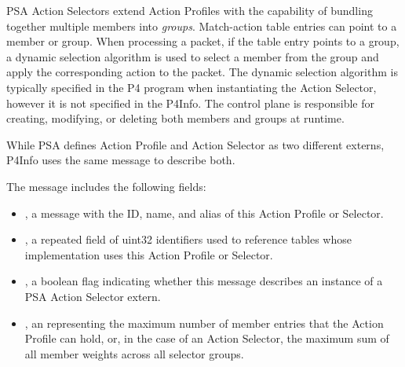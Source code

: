 \documentclass[11pt]{article}
\begin{document}
{%
PSA Action Selectors extend Action Profiles with the capability of bundling
together multiple members into \emph{groups}. Match-action table entries can point to
a member or group. When processing a packet, if the table entry points to a
group, a dynamic selection algorithm is used to select a member from the group
and apply the corresponding action to the packet. The dynamic selection
algorithm is typically specified in the P4 program when instantiating the Action
Selector, however it is not specified in the P4Info. The control plane is
responsible for creating, modifying, or deleting both members and groups at
runtime.%

While PSA defines Action Profile and Action Selector as two different externs,
P4Info uses the same  message to describe both.%

The  message includes the following fields:%

\begin{itemize}%

\item{}
, a  message with the ID, name, and alias of this Action
Profile or Selector.%

\item{}
, a repeated field of uint32 identifiers used to reference tables
whose implementation uses this Action Profile or Selector.%

\item{}
, a boolean flag indicating whether this message describes an
instance of a PSA Action Selector extern.%

\item{}
, an  representing the maximum number of member entries that the
Action Profile can hold, or, in the case of an Action Selector, the maximum sum
of all member weights across all selector groups.%


\end{itemize}}
\end{document}
